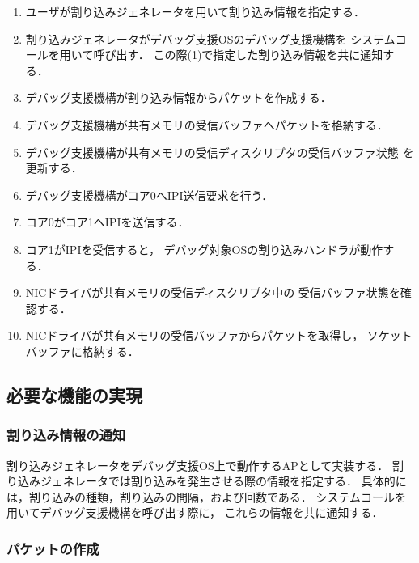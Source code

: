 \documentclass[submit,techreq,noauthor,dvipdfmx]{ipsj}
\begin{document}
\begin{enumerate}
    \item
        ユーザが割り込みジェネレータを用いて割り込み情報を指定する．
    \item 
        割り込みジェネレータがデバッグ支援OSのデバッグ支援機構を
        システムコールを用いて呼び出す．
        この際(1)で指定した割り込み情報を共に通知する．
    \item 
        デバッグ支援機構が割り込み情報からパケットを作成する．
    \item 
        デバッグ支援機構が共有メモリの受信バッファへパケットを格納する．
    \item 
        デバッグ支援機構が共有メモリの受信ディスクリプタの受信バッファ状態
        を更新する．
    \item
        デバッグ支援機構がコア0へIPI送信要求を行う．
    \item
        コア0がコア1へIPIを送信する．
    \item 
        コア1がIPIを受信すると，
        デバッグ対象OSの割り込みハンドラが動作する．
    \item 
        NICドライバが共有メモリの受信ディスクリプタ中の
        受信バッファ状態を確認する．
    \item 
        NICドライバが共有メモリの受信バッファからパケットを取得し，
        ソケットバッファに格納する．
\end{enumerate}

\subsection{必要な機能の実現}\label{sec:realization_of_needed_function}

\subsubsection*{割り込み情報の通知}\label{sec:notification_of_interrupt_information}

割り込みジェネレータをデバッグ支援OS上で動作するAPとして実装する．
割り込みジェネレータでは割り込みを発生させる際の情報を指定する．
具体的には，割り込みの種類，割り込みの間隔，および回数である．
システムコールを用いてデバッグ支援機構を呼び出す際に，
これらの情報を共に通知する．

\subsubsection*{パケットの作成}\label{sec:creating_of_packet}
\end{document}
